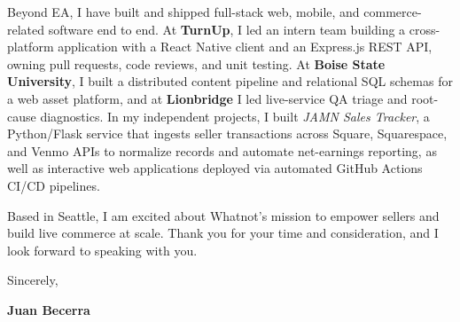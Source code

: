 \documentclass[letterpaper,11pt]{article}
\begin{document}
Beyond EA, I have built and shipped full-stack web, mobile, and commerce-related software end to end. At
\textbf{TurnUp}, I led an intern team building a cross-platform application with a React Native client and
an Express.js REST API, owning pull requests, code reviews, and unit testing. At \textbf{Boise State
University}, I built a distributed content pipeline and relational SQL schemas for a web asset platform, and
at \textbf{Lionbridge} I led live-service QA triage and root-cause diagnostics. In my independent projects, I
built \emph{JAMN Sales Tracker}, a Python/Flask service that ingests seller transactions across Square,
Squarespace, and Venmo APIs to normalize records and automate net-earnings reporting, as well as interactive
web applications deployed via automated GitHub Actions CI/CD pipelines.

Based in Seattle, I am excited about Whatnot's mission to empower sellers and build live commerce at scale.
Thank you for your time and consideration, and I look forward to speaking with you.

\vspace{10pt}
\noindent Sincerely,

\vspace{14pt}
\noindent \textbf{Juan Becerra}
\end{document}
